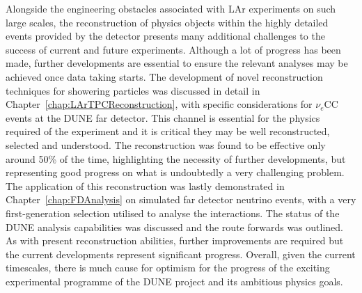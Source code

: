 Alongside the engineering obstacles associated with LAr experiments on such large scales, the reconstruction of physics objects within the highly detailed events provided by the detector presents many additional challenges to the success of current and future experiments.  Although a lot of progress has been made, further developments are essential to ensure the relevant analyses may be achieved once data taking starts.  The development of novel reconstruction techniques for showering particles was discussed in detail in Chapter~\ref{chap:LArTPCReconstruction}, with specific considerations for $\nu_e$CC events at the DUNE far detector.  This channel is essential for the physics required of the experiment and it is critical they may be well reconstructed, selected and understood.  The reconstruction was found to be effective only around 50\% of the time, highlighting the necessity of further developments, but representing good progress on what is undoubtedly a very challenging problem.  The application of this reconstruction was lastly demonstrated in Chapter~\ref{chap:FDAnalysis} on simulated far detector neutrino events, with a very first-generation selection utilised to analyse the interactions.  The status of the DUNE analysis capabilities was discussed and the route forwards was outlined.  As with present reconstruction abilities, further improvements are required but the current developments represent significant progress.  Overall, given the current timescales, there is much cause for optimism for the progress of the exciting experimental programme of the DUNE project and its ambitious physics goals.
